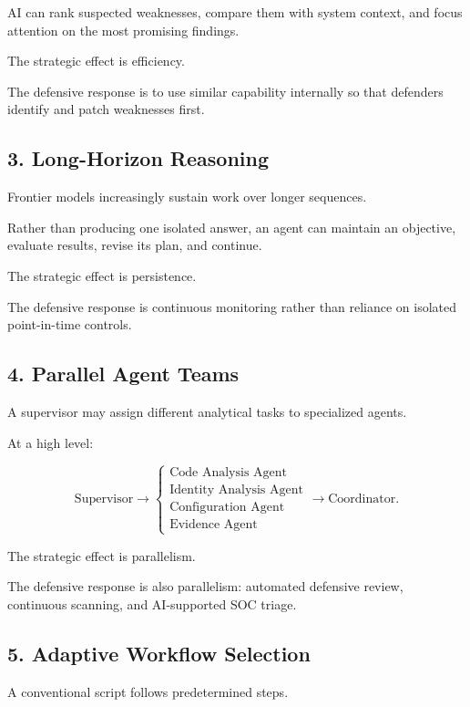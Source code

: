 AI can rank suspected weaknesses, compare them with system context, and focus attention on the most promising findings.

The strategic effect is efficiency.

The defensive response is to use similar capability internally so that defenders identify and patch weaknesses first.

\subsection{3. Long-Horizon Reasoning}

Frontier models increasingly sustain work over longer sequences.

Rather than producing one isolated answer, an agent can maintain an objective, evaluate results, revise its plan, and continue.

The strategic effect is persistence.

The defensive response is continuous monitoring rather than reliance on isolated point-in-time controls.

\subsection{4. Parallel Agent Teams}

A supervisor may assign different analytical tasks to specialized agents.

At a high level:

\begin{equation}
\text{Supervisor}
\rightarrow
\begin{cases}
\text{Code Analysis Agent}\\
\text{Identity Analysis Agent}\\
\text{Configuration Agent}\\
\text{Evidence Agent}
\end{cases}
\rightarrow
\text{Coordinator}.
\end{equation}

The strategic effect is parallelism.

The defensive response is also parallelism: automated defensive review, continuous scanning, and AI-supported SOC triage.

\subsection{5. Adaptive Workflow Selection}

A conventional script follows predetermined steps.

